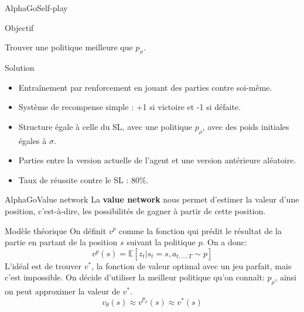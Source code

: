\begin{frame}{AlphaGo}{Self-play}
    \begin{block}{Objectif}
        \begin{center}
            Trouver une politique meilleure que $p_\sigma$.
        \end{center}
    \end{block}

    \begin{block}{Solution}
        \begin{itemize}
            \item Entraînement par renforcement en jouant des parties contre soi-même.
            \item Système de recompense simple : +1 si victoire et -1 si défaite.
            \item Structure égale à celle du SL, avec une politique $p_\rho$, avec des poids initiales égales à $\sigma$.
            \item Parties entre la version actuelle de l'agent et une version antérieure aléatoire.
            \item Taux de réussite contre le SL : 80\%.
        \end{itemize}
    \end{block}
\end{frame}


\begin{frame}{AlphaGo}{Value network}
    La \textbf{value network} nous permet d'estimer la valeur d'une position, c'est-à-dire, les possibilités de gagner à partir de cette position.
    \begin{block}{Modèle théorique}
        On définit $v^p$ comme la fonction qui prédit le résultat de la partie en partant de la position $s$ suivant la politique $p$. On a donc: $$v^p(s) = \mathbb{E}[z_t|s_t=s, a_{t,\dots,T}\sim p]$$
        L'idéal est de trouver $v^*$, la fonction de valeur optimal avec un jeu parfait, mais c'est impossible.
        On décide d'utiliser la meilleur politique qu'on connaît: $p_\rho$, ainsi on peut approximer la valeur de $v^*$. $$v_\theta(s) \approx v^{p_\rho}(s) \approx v^*(s)$$
    \end{block}
\end{frame}

